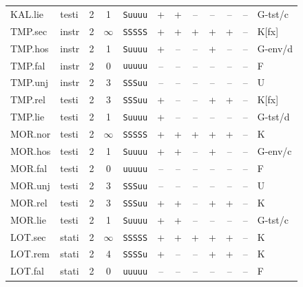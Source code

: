 {\begin{longtable}{@{}llcccccccccl@{}}
KAL.lie & testi & 2 & 1 & \texttt{Suuuu} & \textsf{+} & \textsf{+} & \textsf{--} & \textsf{--} & \textsf{--} & -- & G-tst/c \\
TMP.sec & instr & 2 & $\infty$ & \texttt{SSSSS} & \textsf{+} & \textsf{+} & \textsf{+} & \textsf{+} & \textsf{+} & -- & K[fx] \\
TMP.hos & instr & 2 & 1 & \texttt{Suuuu} & \textsf{+} & \textsf{--} & \textsf{--} & \textsf{+} & \textsf{--} & -- & G-env/d \\
TMP.fal & instr & 2 & 0 & \texttt{uuuuu} & \textsf{--} & \textsf{--} & \textsf{--} & \textsf{--} & \textsf{--} & -- & F \\
TMP.unj & instr & 2 & 3 & \texttt{SSSuu} & \textsf{--} & \textsf{--} & \textsf{--} & \textsf{--} & \textsf{--} & -- & U \\
TMP.rel & testi & 2 & 3 & \texttt{SSSuu} & \textsf{+} & \textsf{--} & \textsf{--} & \textsf{+} & \textsf{+} & -- & K[fx] \\
TMP.lie & testi & 2 & 1 & \texttt{Suuuu} & \textsf{+} & \textsf{--} & \textsf{--} & \textsf{--} & \textsf{--} & -- & G-tst/d \\
MOR.nor & testi & 2 & $\infty$ & \texttt{SSSSS} & \textsf{+} & \textsf{+} & \textsf{+} & \textsf{+} & \textsf{+} & -- & K \\
MOR.hos & testi & 2 & 1 & \texttt{Suuuu} & \textsf{+} & \textsf{+} & \textsf{--} & \textsf{+} & \textsf{--} & -- & G-env/c \\
MOR.fal & testi & 2 & 0 & \texttt{uuuuu} & \textsf{--} & \textsf{--} & \textsf{--} & \textsf{--} & \textsf{--} & -- & F \\
MOR.unj & testi & 2 & 3 & \texttt{SSSuu} & \textsf{--} & \textsf{--} & \textsf{--} & \textsf{--} & \textsf{--} & -- & U \\
MOR.rel & testi & 2 & 3 & \texttt{SSSuu} & \textsf{+} & \textsf{+} & \textsf{--} & \textsf{+} & \textsf{+} & -- & K \\
MOR.lie & testi & 2 & 1 & \texttt{Suuuu} & \textsf{+} & \textsf{+} & \textsf{--} & \textsf{--} & \textsf{--} & -- & G-tst/c \\
LOT.sec & stati & 2 & $\infty$ & \texttt{SSSSS} & \textsf{+} & \textsf{+} & \textsf{+} & \textsf{+} & \textsf{+} & -- & K \\
LOT.rem & stati & 2 & 4 & \texttt{SSSSu} & \textsf{+} & \textsf{--} & \textsf{--} & \textsf{+} & \textsf{+} & -- & K \\
LOT.fal & stati & 2 & 0 & \texttt{uuuuu} & \textsf{--} & \textsf{--} & \textsf{--} & \textsf{--} & \textsf{--} & -- & F \\

\end{longtable}}
